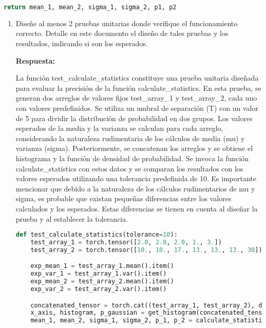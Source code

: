\documentclass[spanish]{article}
\begin{document}
\begin{enumerate}
\begin{enumerate}
\begin{lstlisting}[language=Python, caption=Función de Momentos Estadisticos]
  return mean_1, mean_2, sigma_1, sigma_2, p1, p2
\end{lstlisting}

\newpage
\begin{enumerate}
\item Diseñe al menos 2 pruebas unitarias donde verifique el funcionamiento
correcto. Detalle en este documento el diseño de tales pruebas y los
resultados, indicando si son los esperados. 
\vspace{5px}

\par \textbf{Respuesta:}
\vspace{5px}

\newline
\par La función test\_calculate\_statistics constituye una prueba unitaria diseñada para evaluar la precisión de la función calculate\_statistics. En esta prueba, se generan dos arreglos de valores fijos test\_array\_1 y test\_array\_2, cada uno con valores predefinidos. Se utiliza un umbral de separación (T) con un valor de 5 para dividir la distribución de probabilidad en dos grupos. Los valores esperados de la media y la varianza se calculan para cada arreglo, considerando la naturaleza rudimentaria de los cálculos de media (mu) y varianza (sigma). Posteriormente, se concatenan los arreglos y se obtiene el histograma y la función de densidad de probabilidad. Se invoca la función calculate\_statistics con estos datos y se comparan los resultados con los valores esperados utilizando una tolerancia predefinida de 10. Es importante mencionar que debido a la naturaleza de los cálculos rudimentarios de mu y sigma, es probable que existan pequeñas diferencias entre los valores calculados y los esperados. Estas diferencias se tienen en cuenta al diseñar la prueba y al establecer la tolerancia.
\vspace{5px}

\begin{lstlisting}[language=Python, caption=Pruebas Unitarias]
def test_calculate_statistics(tolerance=10):
    test_array_1 = torch.tensor([2.0, 2.0, 2.0, 1., 3.])
    test_array_2 = torch.tensor([10., 10., 17., 13., 13., 13., 30])

    exp_mean_1 = test_array_1.mean().item()
    exp_var_1 = test_array_1.var().item()
    exp_mean_2 = test_array_2.mean().item()
    exp_var_2 = test_array_2.var().item()

    concatenated_tensor = torch.cat((test_array_1, test_array_2), dim=0)
    x_axis, histogram, p_gaussian = get_histogram(concatenated_tensor)
    mean_1, mean_2, sigma_1, sigma_2, p_1, p_2 = calculate_statistics(5, x_axis,p_gaussian)


\end{lstlisting}
\end{enumerate}
\end{enumerate}
\end{enumerate}
\end{document}
